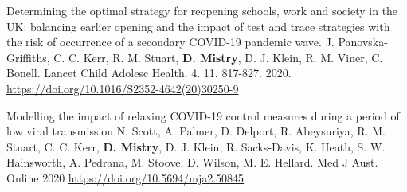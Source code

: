 \begin{cventries}

  \cvpublicationentrytwo
    {Determining the optimal strategy for reopening schools, work and society in the UK: balancing earlier opening and the impact of test and trace strategies with the risk of occurrence of a secondary COVID-19 pandemic wave.} %
    {J. Panovska-Griffiths, C. C. Kerr, R. M. Stuart, \textbf{D. Mistry}, D. J. Klein, R. M. Viner, C. Bonell.} %
    {Lancet Child Adolesc Health.} %
    {4.} %
    {11.} %
    {817-827.} %
    {2020.} %
    {} %
    {\href{https://doi.org/10.1016/S2352-4642(20)30250-9}{https://doi.org/10.1016/S2352-4642(20)30250-9 \faLink\acvHeaderIconSep}} %
    \vspace{1.5mm}

  \cvpublicationentrytwo
    {Modelling the impact of relaxing COVID-19 control measures during a period of low viral transmission} %
    {N. Scott, A. Palmer, D. Delport,  R. Abeysuriya, R. M. Stuart,  C. C. Kerr, \textbf{D. Mistry}, D. J. Klein, R. Sacks‐Davis, K. Heath, S. W. Hainsworth, A. Pedrana, M. Stoove, D. Wilson,  M. E. Hellard.} %
    {Med J Aust.} %
    {Online} %
    {\hspace{-2mm}} %
    {} %
    {2020} %
    {} %
    {\href{https://doi.org/10.5694/mja2.50845}{https://doi.org/10.5694/mja2.50845 \faLink\acvHeaderIconSep}
    } %
    \vspace{1.5mm}


\end{cventries}
